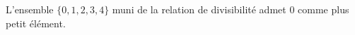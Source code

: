 L'ensemble $\{0,1,2,3,4\}$ muni de la relation de divisibilité admet $0$ comme plus petit élément.

\begin{reponses}
\end{reponses}


